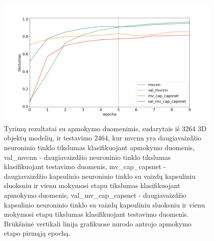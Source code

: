 \begin{figure}[H]
	\centering
	\includegraphics[scale=0.5]{img/less_data_v2.png}
	\caption{
		Tyrimų rezultatai su apmokymo duomenimis, sudarytais iš 3264 3D objektų modelių, ir testavimo 2464, kur mvcnn yra daugiavaizdžio neuroninio tinklo tikslumas klasifikuojant apmokymo duomenis, val\_mvcnn - daugiavaizdžio neuroninio tinklo tikslumas klasifikuojant testavimo duomenis, mv\_cap\_capsnet - daugiavaizdžio kapsulinio neuroninio tinklo su vaizdų kapsuliniu sluoksniu ir vienu mokymosi etapu tikslumas klasifikuojant apmokymo duomenis, val\_mv\_cap\_capsnet - daugiavaizdžio kapsulinio neuroninio tinklo su vaizdų kapsuliniu sluoksniu ir vienu mokymosi etapu tikslumas klasifikuojant testavimo duomenis.	Brūkšninė vertikali linija grafikuose nurodo antrojo apmokymo etapo pirmąją epochą.
	}
	\label{img:less_datav2}
\end{figure}


